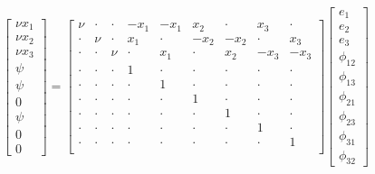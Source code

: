 \begin{equation}\label{eq:sys-Eaton2014}
\left[\begin{array}{c}
	\nu x_1 \\
	\nu x_2 \\
	\nu x_3 \\
	 \psi   \\
	 \psi   \\
	   0    \\
	 \psi   \\
	   0    \\
	   0
\end{array}\right]
=
\left[\begin{array}{ccccccccc}
	 \nu  & \cdot & \cdot & -x_1  & -x_1  &  x_2  & \cdot &  x_3  & \cdot \\
	\cdot &  \nu  & \cdot &  x_1  & \cdot & -x_2  & -x_2  & \cdot &  x_3  \\
	\cdot & \cdot &  \nu  & \cdot &  x_1  & \cdot &  x_2  & -x_3  & -x_3  \\
	\cdot & \cdot & \cdot &   1   & \cdot & \cdot & \cdot & \cdot & \cdot \\
	\cdot & \cdot & \cdot & \cdot &   1   & \cdot & \cdot & \cdot & \cdot \\
	\cdot & \cdot & \cdot & \cdot & \cdot &   1   & \cdot & \cdot & \cdot \\
	\cdot & \cdot & \cdot & \cdot & \cdot & \cdot &   1   & \cdot & \cdot \\
	\cdot & \cdot & \cdot & \cdot & \cdot & \cdot & \cdot &   1   & \cdot \\
	\cdot & \cdot & \cdot & \cdot & \cdot & \cdot & \cdot & \cdot &   1   \\
\end{array}\right]
\left[\begin{array}{c}
	   e_1    \\
	   e_2    \\
	   e_3    \\
	\phi_{12} \\
	\phi_{13} \\
	\phi_{21} \\
	\phi_{23} \\
	\phi_{31} \\
	\phi_{32}
\end{array}\right]
\end{equation}